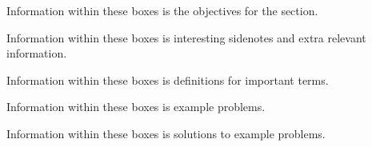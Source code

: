 \documentclass[11pt]{exam}
\begin{document}
\begin{center}  
\end{center}
\vspace{22pt}
\begin{tcolorbox}[objective]
    Information within these boxes is the objectives for the section.
\end{tcolorbox}
\vspace{22pt}
\begin{tcolorbox}[interesting]
    Information within these boxes is interesting sidenotes and extra relevant information.
\end{tcolorbox}
\vspace{22pt}
\begin{tcolorbox}[definition]
    Information within these boxes is definitions for important terms.
\end{tcolorbox}
\vspace{22pt}
\begin{tcolorbox}[example]
    Information within these boxes is example problems.
\end{tcolorbox}
\vspace{22pt}
\begin{tcolorbox}[solution]
    Information within these boxes is solutions to example problems.    
\end{tcolorbox}


\def\inputpathChapterOne{Chapter1/}


\def\inputpathChapterTwo{Chapter2/}

\end{document}
